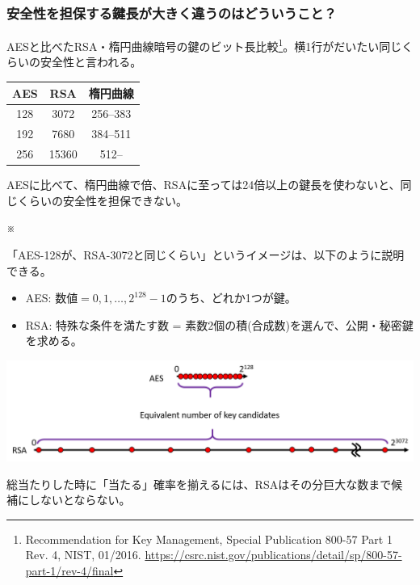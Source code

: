 \documentclass[12pt,dvipdfmx]{beamer}
\begin{document}
\begin{frame}
\frametitle{安全性を担保する鍵長が大きく違うのはどういうこと？}

AESと比べたRSA・楕円曲線暗号の鍵のビット長比較\footnote[frame]{\scriptsize Recommendation for Key Management, Special Publication 800-57 Part 1 Rev. 4, NIST, 01/2016. \url{https://csrc.nist.gov/publications/detail/sp/800-57-part-1/rev-4/final}}。\alert{横1行がだいたい同じくらいの安全性}と言われる。
\begin{table}
\centering
\begin{tabular}{|c||c|c|}
\hline
\textbf{AES} & \textbf{RSA} & \textbf{楕円曲線}\\
\hline
\hline
128 & 3072 & 256--383\\
\hline
192 & 7680 & 384--511\\
\hline
256 & 15360 & 512--\\
\hline
\end{tabular}
\end{table}

\begin{block}{}
AESに比べて、\alert{楕円曲線で倍、RSAに至っては24倍以上}の鍵長を使わないと、同じくらいの安全性を担保できない。
\end{block}

※ 

\end{frame}
\begin{frame}
 
「AES-128が、RSA-3072と同じくらい」というイメージは、以下のように説明できる。
\begin{itemize}
 \item AES: 数値$=0,1,\dots,2^{128}-1$のうち、どれか1つが鍵。
 \item RSA: \alert{特殊な条件を満たす数 = 素数2個の積(合成数)}を選んで、公開・秘密鍵を求める。
\end{itemize}

\begin{center}
\includegraphics[width=\linewidth]{Figs/key-length-image.png} %
\end{center}

総当たりした時に\alert{「当たる」確率を揃えるには、RSAはその分巨大な数まで候補にしないとならない}。
\end{frame}
\end{document}
